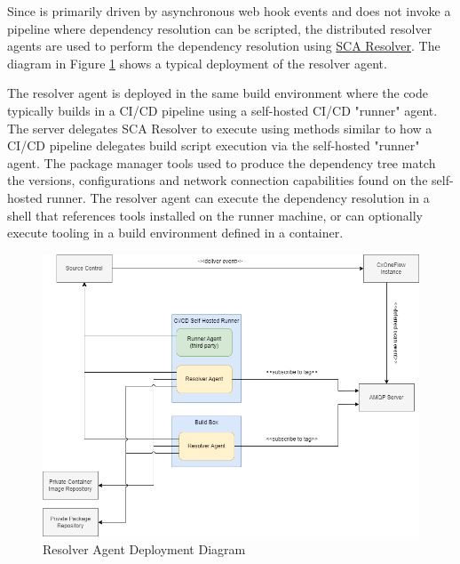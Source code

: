 Since \cxoneflow is primarily driven by asynchronous web hook events and does not invoke a pipeline
where dependency resolution can be scripted, the distributed resolver agents are used to perform the dependency resolution using
\href{https://docs.checkmarx.com/en/34965-19197-checkmarx-sca-resolver-download-and-installation.html}{SCA Resolver}.
The diagram in Figure \ref{fig:resolver-agent-diagram} shows a typical deployment of the resolver agent.  

The resolver agent is deployed in the same build environment where the code typically builds in a CI/CD pipeline using a
self-hosted CI/CD "runner" agent. The \cxoneflow server delegates SCA Resolver to execute using methods similar to how a
CI/CD pipeline delegates build script
execution via the self-hosted "runner" agent.  The package manager tools used to produce the dependency tree match the versions, configurations
and network connection capabilities found on the self-hosted runner.  The resolver agent can execute the dependency resolution in a shell
that references tools installed on the runner machine, or can optionally execute tooling in a build environment defined in a container.


\begin{figure}[ht]
  \includegraphics[width=\textwidth]{graphics/cxoneflow-diagrams-Resolver Agent Diagram.png}
  \caption{Resolver Agent Deployment Diagram}
  \label{fig:resolver-agent-diagram}
\end{figure}






